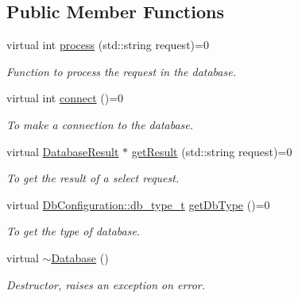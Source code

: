 \subsection*{Public Member Functions}
\begin{DoxyCompactItemize}
\item 
virtual int \hyperlink{classDatabase_a41881436b79aac5f4d8e179056564de1}{process} (std::string request)=0
\begin{DoxyCompactList}\small\item\em Function to process the request in the database. \item\end{DoxyCompactList}\item 
virtual int \hyperlink{classDatabase_aed0ada648871f841cfbe08bc1ee1bf92}{connect} ()=0
\begin{DoxyCompactList}\small\item\em To make a connection to the database. \item\end{DoxyCompactList}\item 
virtual \hyperlink{classDatabaseResult}{DatabaseResult} $\ast$ \hyperlink{classDatabase_a30f002bf9752a54c2a056abc1b8bb4d4}{getResult} (std::string request)=0
\begin{DoxyCompactList}\small\item\em To get the result of a select request. \item\end{DoxyCompactList}\item 
virtual \hyperlink{classDbConfiguration_a4a57e43a5017a5c4833a784a994c91cf}{DbConfiguration::db\_\-type\_\-t} \hyperlink{classDatabase_a668ffe571cb0f9f355a2f874e40cb515}{getDbType} ()=0
\begin{DoxyCompactList}\small\item\em To get the type of database. \item\end{DoxyCompactList}\item 
\hypertarget{classDatabase_a84d399a2ad58d69daab9b05330e1316d}{
virtual \hyperlink{classDatabase_a84d399a2ad58d69daab9b05330e1316d}{$\sim$Database} ()}
\label{classDatabase_a84d399a2ad58d69daab9b05330e1316d}

\begin{DoxyCompactList}\small\item\em Destructor, raises an exception on error. \item\end{DoxyCompactList}\end{DoxyCompactItemize}
